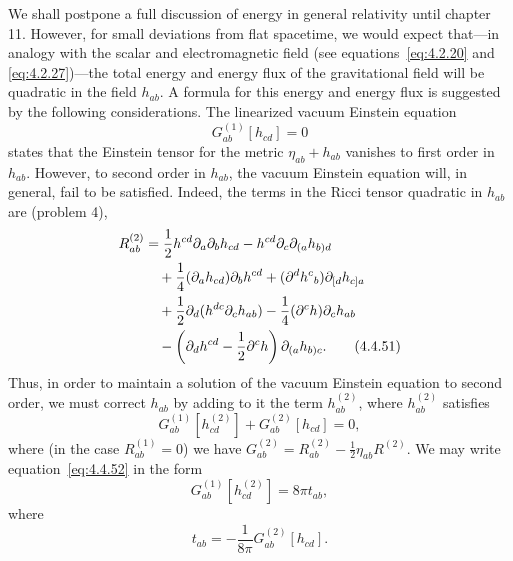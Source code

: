 We shall postpone a full discussion of energy in general relativity until chapter 11.
However, for small deviations from flat spacetime, we would expect that---in
analogy with the scalar and electromagnetic field (see equations~\eqref{eq:4.2.20}
and \eqref{eq:4.2.27})---the total energy and energy flux of the gravitational field
will be quadratic in the field \(h_{ab}\). A formula for this energy and energy flux
is suggested by the following considerations. The linearized vacuum Einstein
equation
\begin{equation}
  G^{(1)}_{ab}[h_{cd}]=0
  \tag{4.4.50}\label{eq:4.4.50}
\end{equation}
states that the Einstein tensor for the metric \(\eta_{ab}+h_{ab}\) vanishes to first
order in \(h_{ab}\). However, to second order in \(h_{ab}\), the vacuum Einstein
equation will, in general, fail to be satisfied. Indeed, the terms in the Ricci tensor
quadratic in \(h_{ab}\) are (problem 4),
\begin{align}
  R^{(2)}_{ab}
    &=\frac12h^{cd}\partial_a\partial_bh_{cd}
      -h^{cd}\partial_c\partial_{(a}h_{b)d}\notag\\
    &\quad+\frac14(\partial_ah_{cd})\partial_bh^{cd}
      +(\partial^dh^c{}_b)\partial_{[d}h_{c]a}\notag\\
    &\quad+\frac12\partial_d(h^{dc}\partial_ch_{ab})
      -\frac14(\partial^ch)\partial_ch_{ab}\notag\\
    &\quad-\left(\partial_dh^{cd}-\frac12\partial^ch\right)
      \partial_{(a}h_{b)c} .
  \tag{4.4.51}\label{eq:4.4.51}
\end{align}
Thus, in order to maintain a solution of the vacuum Einstein equation to second
order, we must correct \(h_{ab}\) by adding to it the term \(h^{(2)}_{ab}\), where
\(h^{(2)}_{ab}\) satisfies
\begin{equation}
  G^{(1)}_{ab}[h^{(2)}_{cd}]+G^{(2)}_{ab}[h_{cd}]=0 ,
  \tag{4.4.52}\label{eq:4.4.52}
\end{equation}
where (in the case \(R^{(1)}_{ab}=0\)) we have
\(G^{(2)}_{ab}=R^{(2)}_{ab}-\tfrac12\eta_{ab}R^{(2)}\). We may write
equation~\eqref{eq:4.4.52} in the form
\begin{equation}
  G^{(1)}_{ab}[h^{(2)}_{cd}]=8\pi t_{ab} ,
  \tag{4.4.53}\label{eq:4.4.53}
\end{equation}
where
\begin{equation}
  t_{ab}=-\frac{1}{8\pi}G^{(2)}_{ab}[h_{cd}] .
  \tag{4.4.54}\label{eq:4.4.54}
\end{equation}

